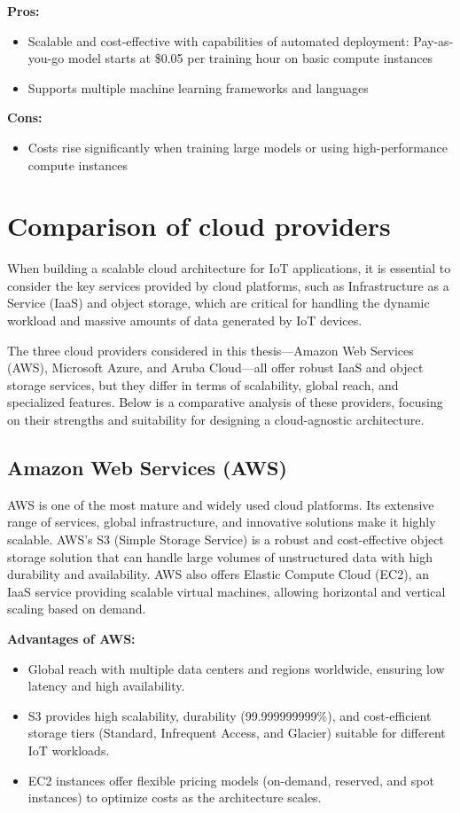 \textbf{Pros:}
\begin{itemize}
    \item Scalable and cost-effective with capabilities of automated deployment: Pay-as-you-go model starts at \$0.05 per training hour on basic compute instances
    \item Supports multiple machine learning frameworks and languages
\end{itemize}

\textbf{Cons:}
\begin{itemize}
    \item Costs rise significantly when training large models or using high-performance compute instances
\end{itemize}

\section{Comparison of cloud providers}
\label{sec:comparison-cloud-providers}

When building a scalable cloud architecture for IoT applications, it is essential to consider the key services provided by cloud platforms, such as Infrastructure as a Service (IaaS) and object storage, which are critical for handling the dynamic workload and massive amounts of data generated by IoT devices.

The three cloud providers considered in this thesis—Amazon Web Services (AWS), Microsoft Azure, and Aruba Cloud—all offer robust IaaS and object storage services, but they differ in terms of scalability, global reach, and specialized features. Below is a comparative analysis of these providers, focusing on their strengths and suitability for designing a cloud-agnostic architecture.

\subsection*{Amazon Web Services (AWS)}
AWS is one of the most mature and widely used cloud platforms. Its extensive range of services, global infrastructure, and innovative solutions make it highly scalable. AWS's S3 (Simple Storage Service) is a robust and cost-effective object storage solution that can handle large volumes of unstructured data with high durability and availability. AWS also offers Elastic Compute Cloud (EC2), an IaaS service providing scalable virtual machines, allowing horizontal and vertical scaling based on demand. 

\textbf{Advantages of AWS:}
\begin{itemize}
    \item Global reach with multiple data centers and regions worldwide, ensuring low latency and high availability.
    \item S3 provides high scalability, durability (99.999999999\%), and cost-efficient storage tiers (Standard, Infrequent Access, and Glacier) suitable for different IoT workloads.
    \item EC2 instances offer flexible pricing models (on-demand, reserved, and spot instances) to optimize costs as the architecture scales.
\end{itemize}


